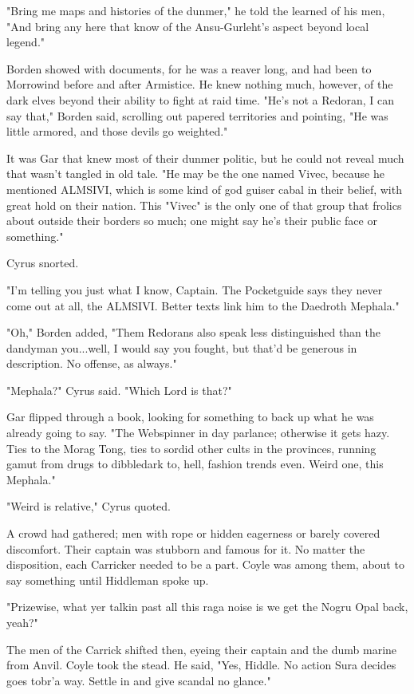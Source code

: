 "Bring me maps and histories of the dunmer," he told the learned of his men, "And bring any here that know of the Ansu-Gurleht's aspect beyond local legend."

Borden showed with documents, for he was a reaver long, and had been to Morrowind before and after Armistice. He knew nothing much, however, of the dark elves beyond their ability to fight at raid time. "He's not a Redoran, I can say that," Borden said, scrolling out papered territories and pointing, "He was little armored, and those devils go weighted."

It was Gar that knew most of their dunmer politic, but he could not reveal much that wasn't tangled in old tale. "He may be the one named Vivec, because he mentioned ALMSIVI, which is some kind of god guiser cabal in their belief, with great hold on their nation. This "Vivec" is the only one of that group that frolics about outside their borders so much; one might say he's their public face or something."

Cyrus snorted.

"I'm telling you just what I know, Captain. The Pocketguide says they never come out at all, the ALMSIVI. Better texts link him to the Daedroth Mephala."

"Oh," Borden added, "Them Redorans also speak less distinguished than the dandyman you...well, I would say you fought, but that'd be generous in description. No offense, as always."

"Mephala?" Cyrus said. "Which Lord is that?"

Gar flipped through a book, looking for something to back up what he was already going to say. "The Webspinner in day parlance; otherwise it gets hazy. Ties to the Morag Tong, ties to sordid other cults in the provinces, running gamut from drugs to dibbledark to, hell, fashion trends even. Weird one, this Mephala."

"Weird is relative," Cyrus quoted.

A crowd had gathered; men with rope or hidden eagerness or barely covered discomfort. Their captain was stubborn and famous for it. No matter the disposition, each Carricker needed to be a part. Coyle was among them, about to say something until Hiddleman spoke up.

"Prizewise, what yer talkin past all this raga noise is we get the Nogru Opal back, yeah?"

The men of the Carrick shifted then, eyeing their captain and the dumb marine from Anvil. Coyle took the stead. He said, "Yes, Hiddle. No action Sura decides goes tobr'a way. Settle in and give scandal no glance."

